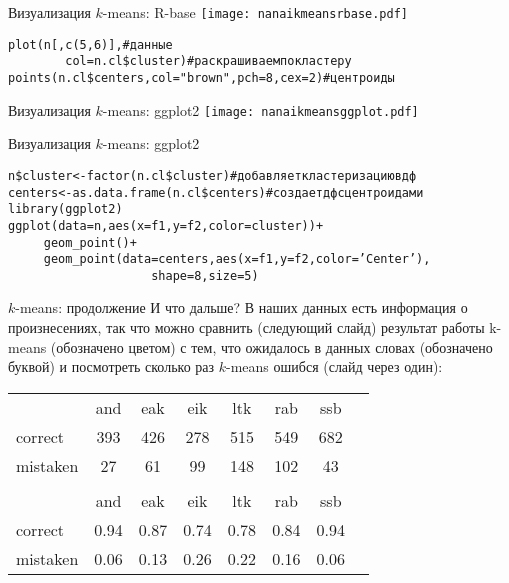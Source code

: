 \begin{frame}{Визуализация $k$-means: R-base}
\texttt{[image: nanaikmeansrbase.pdf]}\\
\scriptsize
\vspace{-3mm}
\begin{alltt}
plot(n[, c(5,6)], \hfill \# данные\\
~~~~~~~~\alert{col = n.cl\$cluster}) \hfill \# раскрашиваем по кластеру\\
points(\alert{n.cl\$centers}, col = "brown"{}, pch = 8, cex = 2) \hfill \# центроиды\\
\end{alltt}
\normalsize
\end{frame}
\begin{frame}{Визуализация $k$-means: ggplot2}
\texttt{[image: nanaikmeansggplot.pdf]}\\
\end{frame}
\begin{frame}{Визуализация $k$-means: ggplot2}
\scriptsize
\begin{alltt}
n\$cluster <- factor(n.cl\$cluster) \hfill \# добавляет кластеризацию в дф\\
centers <- as.data.frame(n.cl\$centers) \hfill \# создает дф с центроидами \bigskip\\
library(ggplot2)\\
ggplot(\alert{data=n}, aes(x=f1, y=f2, \alert{color=cluster})) + \\
~~~~~geom\_point() + \\
~~~~~geom\_point(\alert{data=centers}, aes(x=f1,y=f2, color='Center'), \\
~~~~~~~~~~~~~~~~~~~~shape = 8, size = 5) \\
\end{alltt}
\normalsize
\end{frame}
\begin{frame}{$k$-means: продолжение}
И что дальше? В наших данных есть информация о произнесениях, так что можно сравнить (следующий слайд) результат работы k-means (обозначено цветом) с тем, что ожидалось в данных словах (обозначено буквой) и посмотреть сколько раз $k$-means ошибся (слайд через один):\\
\vfill
\begin{center}
\small
\begin{tabular}{lccccccc}
 & and & eak & eik & ltk & rab & ssb \\ 
correct & 393 & 426 & 278 & 515 & 549 & 682 \\ 
mistaken & 27 & 61 & 99 & 148 & 102 & 43 \\ 
 &  &  &  &  &  \\ 
 & and & eak & eik & ltk & rab & ssb \\ 
correct & 0.94 & 0.87 & 0.74 & 0.78 & 0.84 & 0.94 \\ 
mistaken & 0.06 & 0.13 & 0.26 & 0.22 & 0.16 & 0.06 \\ 
\end{tabular}
\normalsize
\end{center}
\end{frame}

